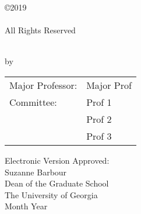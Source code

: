 \documentclass[12pt, notitlepage ]{report}
\begin{document}
\newpage
\thispagestyle{empty}
\vspace*{6.6in}
\begin{center}
  \copyright 2019\\
  \docauthor\\
  All Rights Reserved
\end{center}

\newpage
\thispagestyle{empty}
\vspace*{18pt}
\begin{center}
  \textsc{\doctitle}\\[18pt]
  by\\[18pt]
  \textsc{\docauthor}
\end{center}
\vfill

\begin{flushright}
  \begin{tabular}{ll}
    Major Professor: & Major Prof \\ [8pt]
    Committee: & Prof 1 \\
    & Prof 2 \\
    & Prof 3 \\
  \end{tabular}
\end{flushright}

\vspace*{3cm}

\begin{flushleft}
  Electronic Version Approved:\\[12pt]
  Suzanne Barbour\\
  Dean of the Graduate School\\
  The University of Georgia\\
  Month Year
\end{flushleft}
\vspace*{1.5cm}







\tableofcontents

\listoffigures
{}
\listoftables
\clearpage









\begin{appendices}
  
\end{appendices}

\newpage
{} %


\end{document}
